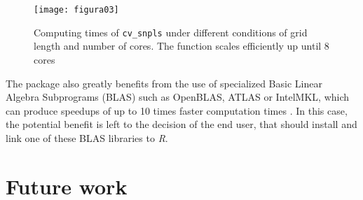 \begin{figure}[hbtp]
	\centering
\texttt{[image: figura03]}
\caption{Computing times of \texttt{cv\_snpls} under different conditions of grid length and number of cores. The function scales efficiently up until 8 cores}
\label{figura03}
\end{figure}

The package also greatly benefits from the use of specialized Basic Linear Algebra Subprograms (BLAS) such as OpenBLAS, ATLAS or Intel\textregistered  MKL, which can produce speedups of up to 10 times faster computation times \parencite{xianyi2014openblas, wang2014intel}. In this case, the potential benefit is left to the decision of the end user, that should install and link one of these BLAS libraries to \textit{R}.

\section{Future work}


